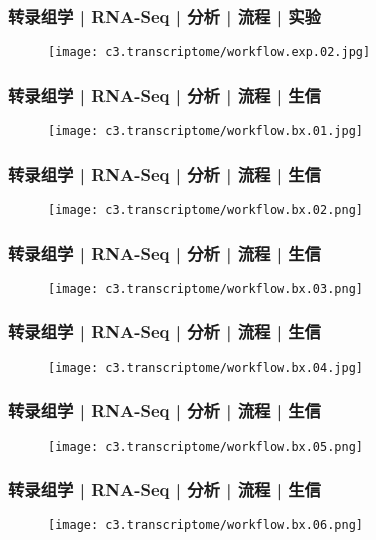 \begin{frame}
  \frametitle{转录组学 | RNA-Seq | 分析 | 流程 | 实验}
  \begin{figure}
    \centering
    \texttt{[image: c3.transcriptome/workflow.exp.02.jpg]}
  \end{figure}
\end{frame}

\begin{frame}
  \frametitle{转录组学 | RNA-Seq | 分析 | 流程 | 生信}
  \begin{figure}
    \centering
    \texttt{[image: c3.transcriptome/workflow.bx.01.jpg]}
  \end{figure}
\end{frame}

\begin{frame}
  \frametitle{转录组学 | RNA-Seq | 分析 | 流程 | 生信}
  \begin{figure}
    \centering
    \texttt{[image: c3.transcriptome/workflow.bx.02.png]}
  \end{figure}
\end{frame}

\begin{frame}
  \frametitle{转录组学 | RNA-Seq | 分析 | 流程 | 生信}
  \begin{figure}
    \centering
    \texttt{[image: c3.transcriptome/workflow.bx.03.png]}
  \end{figure}
\end{frame}

\begin{frame}
  \frametitle{转录组学 | RNA-Seq | 分析 | 流程 | 生信}
  \begin{figure}
    \centering
    \texttt{[image: c3.transcriptome/workflow.bx.04.jpg]}
  \end{figure}
\end{frame}

\begin{frame}
  \frametitle{转录组学 | RNA-Seq | 分析 | 流程 | 生信}
  \begin{figure}
    \centering
    \texttt{[image: c3.transcriptome/workflow.bx.05.png]}
  \end{figure}
\end{frame}

\begin{frame}
  \frametitle{转录组学 | RNA-Seq | 分析 | 流程 | 生信}
  \begin{figure}
    \centering
    \texttt{[image: c3.transcriptome/workflow.bx.06.png]}
  \end{figure}
\end{frame}

